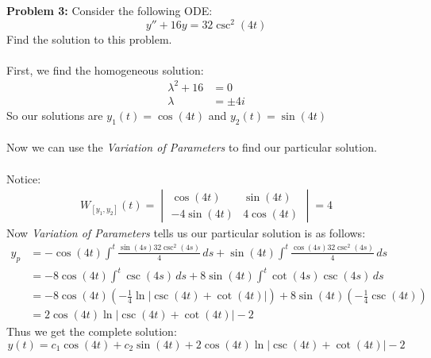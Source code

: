 \documentclass[12pt]{article}
\begin{document}
\noindent\textbf{Problem 3: }Consider the following ODE:
	$$
	y'' + 16y = 32\csc^2(4t)
	$$
Find the solution to this problem.
\\ \\
First, we find the homogeneous solution: 
	\begin{align*}
		\lambda^2 + 16 &= 0 \\
		\lambda &= \pm 4i
	\end{align*}
So our solutions are $y_1(t) = \cos(4t)$ and $y_2(t) = \sin(4t)$
\\ \\
Now we can use the \textit{Variation of Parameters} to find our particular solution.
\\ \\
Notice:
	\begin{align*}
		W_{[y_1,y_2]}(t) = 
		\begin{vmatrix}
			\cos(4t) & \sin(4t) \\
			-4\sin(4t) & 4\cos(4t)
		\end{vmatrix}
		= 4
	\end{align*}
Now \textit{Variation of Parameters} tells us our particular solution is as follows:
	\begin{align*}
		y_p &= -\cos(4t) \int^t \frac{\sin(4s)32\csc^2(4s)}{4}\,ds + \sin(4t) \int^t \frac{\cos(4s)32\csc^2(4s)}{4}\,ds \\
		&= -8\cos(4t) \int^t \csc(4s)\,ds + 8\sin(4t) \int^t \cot(4s)\csc(4s)\,ds \\
		&= -8\cos(4t) \left(-\frac{1}{4}\ln|\csc(4t)+ \cot(4t)| \right) + 8\sin(4t) \left(-\frac{1}{4} \csc(4t) \right) \\
		&= 2\cos(4t)\ln|\csc(4t)+ \cot(4t)| - 2
	\end{align*} 
Thus we get the complete solution:
	$$
	y(t) = c_1\cos(4t) + c_2\sin(4t) + 2\cos(4t)\ln|\csc(4t)+ \cot(4t)| - 2
	$$
	

	
	
	
	
	
	
	
	
	
	
	
	
	
	
	
	
	
	
	
	
	
\end{document}

